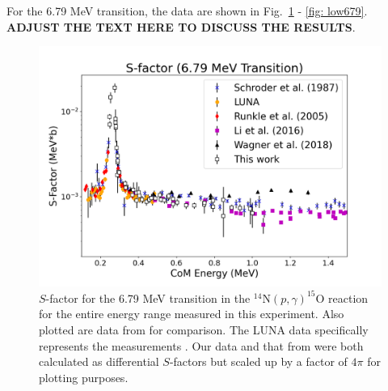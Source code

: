 For the 6.79 MeV transition, the data are shown in Fig.~\ref{fig: full679} - \ref{fig: low679}. \textbf{ADJUST THE TEXT HERE TO DISCUSS THE RESULTS}.


\begin{figure}
		\includegraphics[width=1.0\linewidth]{figures/full679.png}
	\caption{$S$-factor for the 6.79 MeV transition in the $^{14}$N$\left( p,\gamma \right) ^{15}$O reaction for the entire energy range measured in this experiment. Also plotted are data from \cite{Schroder1987, Formicola2004, Imbriani2005, Runkle2005, Marta2008, Marta2011, Li2016, Wagner2018} for comparison. The LUNA data specifically represents the measurements \cite{Formicola2004, Imbriani2005, Marta2008, Marta2011}. Our data and that from \citet{Li2016} were both calculated as differential $S$-factors but scaled up by a factor of $4\pi$ for plotting purposes.  }
	\label{fig: full679}
\end{figure}

